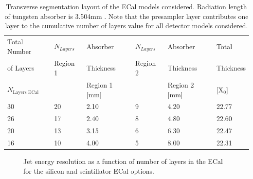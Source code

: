 \begin{table}[h!]
\centering
\begin{tabular}{ l l l l l l}
\hline
Total Number & $N_{Layers}$ & Absorber & $N_{Layers}$ & Absorber & Total  \\
of Layers & Region 1 & Thickness & Region 2 & Thickness & Thickness \\
$N_{\text{Layers ECal}}$ & & Region 1 [mm] & &  Region 2 [mm] &  [$\text{X}_{0}$] \\

\hline
30 & 20 & 2.10 & 9 & 4.20 & 22.77 \\
26 & 17 & 2.40 & 8 & 4.80 & 22.60 \\
20 & 13 & 3.15 & 6 & 6.30 & 22.47 \\
16 & 10 & 4.00 & 5 & 8.00 & 22.31\\
\hline
\end{tabular}
\caption[Transverse segmentation layout of the ECal models considered.]{Transverse segmentation layout of the ECal models considered.  Radiation length of tungsten absorber is 3.504mm \cite{Olive:2016xmw}.  Note that the presampler layer contributes one layer to the cumulative number of layers value for all detector models considered.}
\label{table:nlayersecaloption}
\end{table}

\begin{figure}
\centering
{}
 \hfill
\caption[Jet energy resolution as a function of number of layers in the ECal.]{Jet energy resolution as a function of number of layers in the ECal for the silicon and scintillator ECal options.}
\label{fig:ecalnlayers}
\end{figure}

